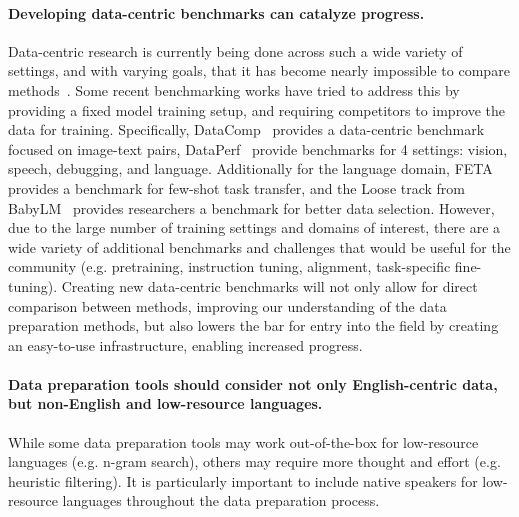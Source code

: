 \paragraph{Developing data-centric benchmarks can catalyze progress.}
Data-centric research is currently being done across such a wide variety of settings, and with varying goals, that it has become nearly impossible to compare methods~\citep{albalak2024survey}. Some recent benchmarking works have tried to address this by providing a fixed model training setup, and requiring competitors to improve the data for training.
Specifically, DataComp~\citep{gadre2023datacomp} provides a data-centric benchmark focused on image-text pairs, DataPerf~\citep{mazumder2023dataperf} provide benchmarks for 4 settings: vision, speech, debugging, and language. Additionally for the language domain, FETA~\citep{albalak-etal-2022-feta} provides a benchmark for few-shot task transfer, and the Loose track from BabyLM~\citep{warstadt-etal-2023-findings} provides researchers a benchmark for better data selection.
However, due to the large number of training settings and domains of interest, there are a wide variety of additional benchmarks and challenges that would be useful for the community (e.g. pretraining, instruction tuning, alignment, task-specific fine-tuning). Creating new data-centric benchmarks will not only allow for direct comparison between methods, improving our understanding of the data preparation methods, but also lowers the bar for entry into the field by creating an easy-to-use infrastructure, enabling increased progress.

\paragraph{Data preparation tools should consider not only English-centric data, but non-English and low-resource languages.}
While some data preparation tools may work out-of-the-box for low-resource languages (e.g. n-gram search), others may require more thought and effort (e.g. heuristic filtering). It is particularly important to include native speakers for low-resource languages throughout the data preparation process.
